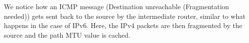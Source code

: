 We notice how an ICMP message (Destination unreachable (Fragmentation needed)) gets sent back to the source by the intermediate router, similar to what happens in the case of IPv6. Here, the IPv4 packets are then fragmented by the source and the path MTU value is cached.